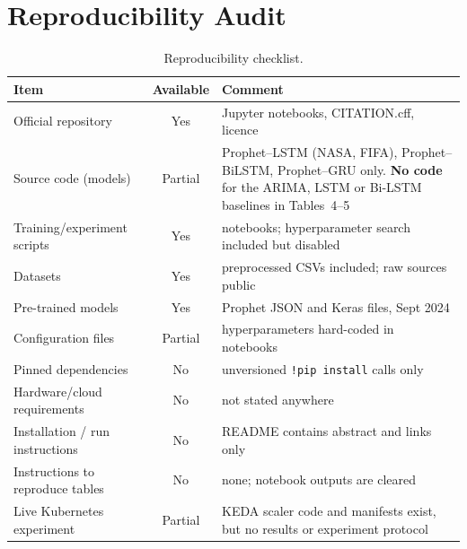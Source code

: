 \documentclass[11pt,a4paper]{article}
\newcommand{\ok}{\textcolor{green!50!black}{Yes}}
\newcommand{\no}{\textcolor{red!70!black}{No}}
\newcommand{\partly}{\textcolor{orange!80!black}{Partial}}
\begin{document}
\section{Reproducibility Audit}
\begin{table}[h]\centering\small
\caption{Reproducibility checklist.}\label{tab:check}
\begin{tabularx}{\textwidth}{@{}lcL@{}}\toprule
Item & Available & Comment \\\midrule
Official repository & \ok & Jupyter notebooks, CITATION.cff, licence \\
Source code (models) & \partly & Prophet--LSTM (NASA, FIFA), Prophet--BiLSTM, Prophet--GRU only. \textbf{No code} for the ARIMA, LSTM or Bi-LSTM baselines in Tables~4--5 \\
Training/experiment scripts & \ok & notebooks; hyperparameter search included but disabled \\
Datasets & \ok & preprocessed CSVs included; raw sources public \\
Pre-trained models & \ok & Prophet JSON and Keras files, Sept 2024 \\
Configuration files & \partly & hyperparameters hard-coded in notebooks \\
Pinned dependencies & \no & unversioned \texttt{!pip install} calls only \\
Hardware/cloud requirements & \no & not stated anywhere \\
Installation / run instructions & \no & README contains abstract and links only \\
Instructions to reproduce tables & \no & none; notebook outputs are cleared \\
Live Kubernetes experiment & \partly & KEDA scaler code and manifests exist, but no results or experiment protocol \\
\bottomrule\end{tabularx}
\end{table}

\end{document}
